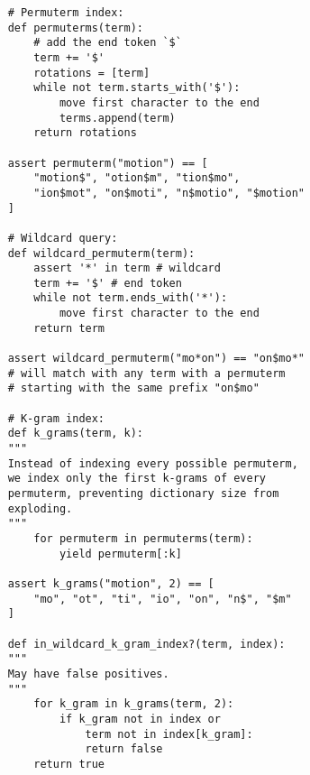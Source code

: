 \begin{lstlisting}
    # Permuterm index:
    def permuterms(term):
        # add the end token `$`
        term += '$'
        rotations = [term]
        while not term.starts_with('$'):
            move first character to the end
            terms.append(term)
        return rotations

    assert permuterm("motion") == [
        "motion$", "otion$m", "tion$mo", 
        "ion$mot", "on$moti", "n$motio", "$motion"
    ]

    # Wildcard query:
    def wildcard_permuterm(term):
        assert '*' in term # wildcard
        term += '$' # end token
        while not term.ends_with('*'):
            move first character to the end
        return term

    assert wildcard_permuterm("mo*on") == "on$mo*"
    # will match with any term with a permuterm
    # starting with the same prefix "on$mo"

    # K-gram index:
    def k_grams(term, k):
    """
    Instead of indexing every possible permuterm,
    we index only the first k-grams of every
    permuterm, preventing dictionary size from
    exploding.
    """
        for permuterm in permuterms(term):
            yield permuterm[:k]
    
    assert k_grams("motion", 2) == [
        "mo", "ot", "ti", "io", "on", "n$", "$m"
    ]

    def in_wildcard_k_gram_index?(term, index):
    """
    May have false positives.
    """
        for k_gram in k_grams(term, 2):
            if k_gram not in index or
                term not in index[k_gram]:
                return false
        return true
\end{lstlisting}

